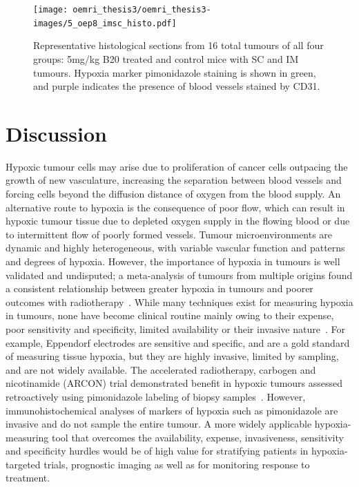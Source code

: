 \begin{figure}[htbp]
   \centering
   \texttt{[image: oemri\_thesis3/oemri\_thesis3-images/5\_oep8\_imsc\_histo.pdf]} %
   \caption{Representative histological sections from 16 total tumours of all four groups: 5mg/kg B20 treated and control mice with \acs{SC} and \acs{IM} tumours.
   Hypoxia marker pimonidazole staining is shown in green, and purple indicates the presence of blood vessels stained by CD31.}
   \label{allHisto}
\end{figure}

\section{Discussion}

Hypoxic tumour cells may arise due to proliferation of cancer cells outpacing the growth of new vasculature, increasing the separation between blood vessels and forcing cells beyond the diffusion distance of oxygen from the blood supply. 
An alternative route to hypoxia is the consequence of poor flow, which can result in hypoxic tumour tissue due to depleted oxygen supply in the flowing blood or due to intermittent flow of poorly formed vessels. 
Tumour microenvironments are dynamic and highly heterogeneous, with variable vascular function and patterns and degrees of hypoxia.
However, the importance of hypoxia in tumours is well validated and undisputed; a meta-analysis of tumours from multiple origins found a consistent relationship between greater hypoxia in tumours and poorer outcomes with radiotherapy~\cite{Horsman:2012kw}.
While many techniques exist for measuring hypoxia in tumours, none have become clinical routine mainly owing to their expense, poor sensitivity and specificity, limited availability or their invasive nature~\cite{Colliez:2017fc,Baumann:2016gr}. 
For example, Eppendorf electrodes are sensitive and specific, and are a gold standard of measuring tissue hypoxia, but they are highly invasive, limited by sampling, and are not widely available. 
The accelerated radiotherapy, carbogen and nicotinamide (ARCON) trial demonstrated benefit in hypoxic tumours assessed retroactively using pimonidazole labeling of biopsy samples~\cite{Kaanders:2002wl}. 
However, immunohistochemical analyses of markers of hypoxia such as pimonidazole are invasive and do not sample the entire tumour.
A more widely applicable hypoxia-measuring tool that overcomes the availability, expense, invasiveness, sensitivity and specificity hurdles would be of high value for stratifying patients in hypoxia-targeted trials, prognostic imaging as well as for monitoring response to treatment. 

